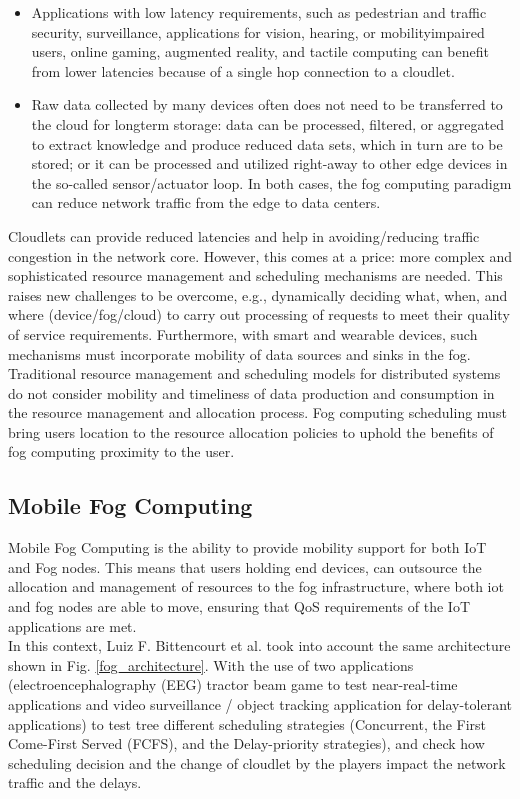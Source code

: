 \begin{itemize}
	\item Applications with low latency requirements, such as pedestrian and traffic security, surveillance, applications for vision, hearing, or mobilityimpaired users, online gaming, augmented reality, and tactile computing can benefit from lower latencies because of a single hop connection to a cloudlet.
	\item Raw data collected by many devices often does not need to be transferred to the cloud for longterm storage: data can be processed, filtered, or aggregated to extract knowledge and produce reduced data sets, which in turn are to be stored; or it can be processed and utilized right-away to other edge devices in the so-called sensor/actuator loop. In both cases, the fog computing paradigm can reduce network traffic from the edge to data centers.
\end{itemize}

Cloudlets can provide reduced latencies and help in avoiding/reducing traffic congestion in the network core. However, this comes at a price: more complex and sophisticated resource management and scheduling mechanisms are needed. This raises new challenges to be overcome, e.g., dynamically deciding what, when, and where (device/fog/cloud) to carry out processing of requests to meet their quality of service requirements. Furthermore, with smart and wearable devices, such mechanisms must incorporate mobility of data sources and sinks in the fog. Traditional resource management and scheduling models for distributed systems do not consider mobility and timeliness of data production and consumption in the resource management and allocation process. Fog computing scheduling must bring users location to the resource allocation policies to uphold the benefits of fog computing proximity to the user.

\vfill\pagebreak
\subsection{Mobile Fog Computing}
\label{sec:Mobility}
Mobile Fog Computing is the ability to provide mobility support for both IoT and Fog nodes. This means that users holding end devices, can outsource the allocation and management of resources to the fog infrastructure, where both iot and fog nodes are able to move, ensuring that QoS requirements of the IoT applications are met.\\

In this context, Luiz F. Bittencourt et al. \cite{bittencourt2017mobility} took into account the same architecture shown in Fig. \ref{fog_architecture}. With the use of two applications (electroencephalography (EEG) tractor beam game to test near-real-time applications and video surveillance / object tracking application for delay-tolerant applications) to test tree different scheduling strategies (Concurrent, the First Come-First Served (FCFS), and the Delay-priority strategies), and check how scheduling decision and the change of cloudlet by the players impact the network traffic and the delays.\\

